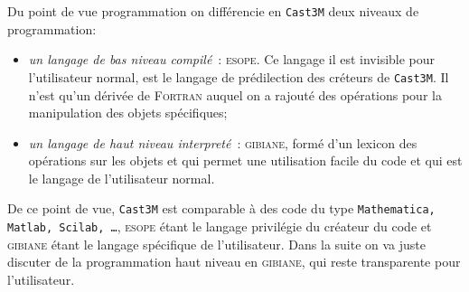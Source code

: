 Du point de vue programmation on différencie en \texttt{Cast3M} deux niveaux 
de programmation:
\begin{itemize}
\item \textit{un langage de bas niveau compilé}~: \textsc{esope}. Ce langage il est invisible pour l'utilisateur normal,
est le langage de prédilection des créteurs de \texttt{Cast3M}. Il n'est qu'un dérivée de \textsc{Fortran} auquel on a
rajouté des opérations pour la manipulation des objets spécifiques;
\item \textit{un langage de haut niveau interpreté}~: \textsc{gibiane}, formé d'un lexicon des opérations 
sur les objets et qui permet une utilisation facile du code et qui est le langage de l'utilisateur normal. 
\end{itemize}
De ce point de vue, \texttt{Cast3M} est comparable à des code du type \texttt{Mathematica, Matlab, Scilab, \ldots},
\textsc{esope} étant le langage privilégie du créateur du code et \textsc{gibiane} étant le langage 
spécifique de l'utilisateur.  Dans la suite on va juste discuter de la programmation haut niveau 
en \textsc{gibiane}, qui reste transparente pour l'utilisateur.   

